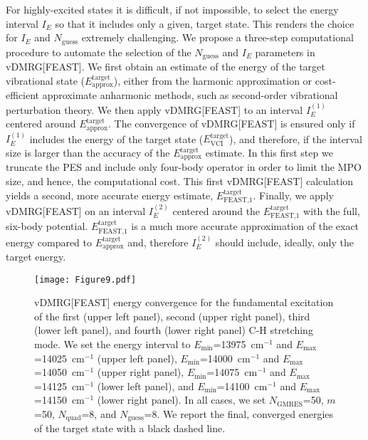 \documentclass[journal=jctcce]{achemso}
\begin{document}
\noindent For highly-excited states it is difficult, if not impossible, to select the energy interval $I_E$ so that it includes only a given, target state.
This renders the choice for $I_E$ and $N_\text{guess}$ extremely challenging.
We propose a three-step computational procedure to automate the selection of the $N_\text{guess}$ and $I_E$ parameters in vDMRG[FEAST].
We first obtain an estimate of the energy of the target vibrational state ($E_\text{approx}^\text{target}$), either from the harmonic approximation or cost-efficient approximate anharmonic methods, such as second-order vibrational perturbation theory.\cite{Barone2005_VPT2}
We then apply vDMRG[FEAST] to an interval $I_E^{(1)}$ centered around $E_\text{approx}^\text{target}$.
The convergence of vDMRG[FEAST] is ensured only if $I_E^{(1)}$ includes the energy of the target state ($E_\text{VCI}^\text{target}$), and therefore, if the interval size is larger than the accuracy of the $E_\text{approx}^\text{target}$ estimate.
In this first step we truncate the PES and include only four-body operator in order to limit the MPO size, and hence, the computational cost.
This first vDMRG[FEAST] calculation yields a second, more accurate energy estimate, $E_\text{FEAST,1}^\text{target}$.
Finally, we apply vDMRG[FEAST] on an interval $I_E^{(2)}$ centered around the $E_\text{FEAST,1}^\text{target}$ with the full, six-body potential.
$E_\text{FEAST,1}^\text{target}$ is a much more accurate approximation of the exact energy compared to $E_\text{approx}^\text{target}$ and, therefore $I_E^{(2)}$ should include, ideally, only the target energy.

\begin{figure}[htbp!]
  \centering
  \texttt{[image: Figure9.pdf]}
  \caption{vDMRG[FEAST] energy convergence for the fundamental excitation of the first (upper left panel), second (upper right panel), third (lower left panel), and fourth (lower right panel) C-H stretching mode. 
  We set the energy interval to $E_\text{min}$=13975~cm$^{-1}$ and $E_\text{max}$=14025~cm$^{-1}$ (upper left panel), $E_\text{min}$=14000~cm$^{-1}$ and $E_\text{max}$=14050~cm$^{-1}$ (upper right panel), $E_\text{min}$=14075~cm$^{-1}$ and $E_\text{max}$=14125~cm$^{-1}$ (lower left panel), and $E_\text{min}$=14100~cm$^{-1}$ and $E_\text{max}$=14150~cm$^{-1}$ (lower right panel).
  In all cases, we set $N_\text{GMRES}$=50, $m$=50, $N_\text{quad}$=8, and $N_\text{guess}$=8.
  We report the final, converged energies of the target state with a black dashed line.}
  \label{fig:CH_Quartic_FEAST}
\end{figure}
\end{document}
